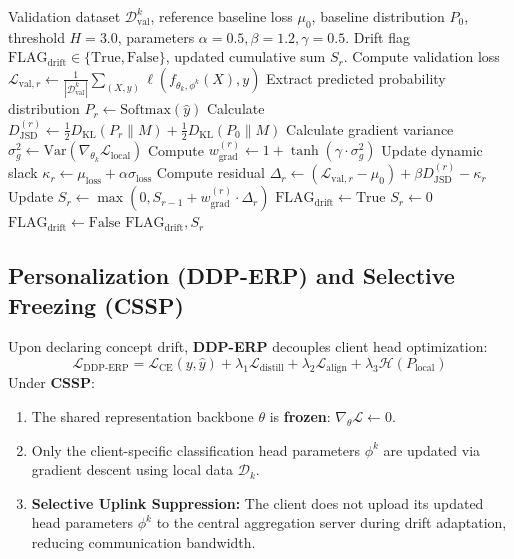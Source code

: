 \documentclass[final,5p,times,twocolumn]{elsarticle}
\begin{document}
\begin{algorithm}[!t]
\caption{Adaptive Divergence-Weighted CUSUM (AD-CUSUM)}\label{alg:ad_cusum}
\begin{algorithmic}[1]
\REQUIRE Validation dataset $\mathcal{D}_{\text{val}}^k$, reference baseline loss $\mu_0$, baseline distribution $P_0$, threshold $H = 3.0$, parameters $\alpha = 0.5, \beta = 1.2, \gamma = 0.5$.
\ENSURE Drift flag $\text{FLAG}_{\text{drift}} \in \{\text{True}, \text{False}\}$, updated cumulative sum $S_r$.
\STATE Compute validation loss $\mathcal{L}_{\text{val}, r} \leftarrow \frac{1}{|\mathcal{D}_{\text{val}}^k|} \sum_{(X, y)} \ell(f_{\theta_k, \phi^k}(X), y)$
\STATE Extract predicted probability distribution $P_r \leftarrow \text{Softmax}(\hat{y})$
\STATE Calculate $D_{\text{JSD}}^{(r)} \leftarrow \frac{1}{2} D_{\text{KL}}(P_r \parallel M) + \frac{1}{2} D_{\text{KL}}(P_0 \parallel M)$
\STATE Calculate gradient variance $\sigma_g^2 \leftarrow \text{Var}(\nabla_{\theta_k} \mathcal{L}_{\text{local}})$
\STATE Compute $w_{\text{grad}}^{(r)} \leftarrow 1 + \tanh(\gamma \cdot \sigma_g^2)$
\STATE Update dynamic slack $\kappa_r \leftarrow \mu_{\text{loss}} + \alpha \sigma_{\text{loss}}$
\STATE Compute residual $\Delta_r \leftarrow (\mathcal{L}_{\text{val}, r} - \mu_0) + \beta D_{\text{JSD}}^{(r)} - \kappa_r$
\STATE Update $S_r \leftarrow \max\left(0, S_{r-1} + w_{\text{grad}}^{(r)} \cdot \Delta_r\right)$
    \STATE $\text{FLAG}_{\text{drift}} \leftarrow \text{True}$
    \STATE $S_r \leftarrow 0$ 
\ELSE
    \STATE $\text{FLAG}_{\text{drift}} \leftarrow \text{False}$
\ENDIF
\RETURN $\text{FLAG}_{\text{drift}}, S_r$
\end{algorithmic}
\end{algorithm}

\subsection{Personalization (DDP-ERP) and Selective Freezing (CSSP)}
Upon declaring concept drift, \textbf{DDP-ERP} decouples client head optimization:
\begin{equation}
\mathcal{L}_{\text{DDP-ERP}} = \mathcal{L}_{\text{CE}}(y, \hat{y}) + \lambda_1 \mathcal{L}_{\text{distill}} + \lambda_2 \mathcal{L}_{\text{align}} + \lambda_3 \mathcal{H}(P_{\text{local}})
\end{equation}
Under \textbf{CSSP}:
\begin{enumerate}
    \item The shared representation backbone $\theta$ is \textbf{frozen}: $\nabla_\theta \mathcal{L} \leftarrow 0$.
    \item Only the client-specific classification head parameters $\phi^k$ are updated via gradient descent using local data $\mathcal{D}_k$.
    \item \textbf{Selective Uplink Suppression:} The client does not upload its updated head parameters $\phi^k$ to the central aggregation server during drift adaptation, reducing communication bandwidth.
\end{enumerate}
\end{document}
